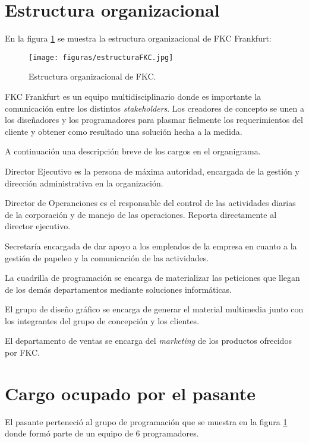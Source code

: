 \section{Estructura organizacional}

En la figura \ref{fig:estructuraFKC} se muestra la estructura organizacional de \gls{FKC} Frankfurt:

\begin{figure}[h]
\begin{center}
	\texttt{[image: figuras/estructuraFKC.jpg]}
	\caption{Estructura organizacional de \gls{FKC}.} \label{fig:estructuraFKC}
\end{center}
\end{figure}

\gls{FKC} Frankfurt es un equipo multidisciplinario donde es importante la comunicación entre los distintos \emph{stakeholders}. Los creadores de concepto se unen a los diseñadores y los programadores para plasmar fielmente los requerimientos del cliente y obtener como resultado una solución hecha a la medida.

A continuación una descripción breve de los cargos en el organigrama.

Director Ejecutivo es la persona de máxima autoridad, encargada de la gestión y dirección administrativa en la organización.

Director de Operanciones es el responsable del control de las actividades diarias de la corporación y de manejo de las operaciones. Reporta directamente al director ejecutivo.

Secretaría encargada de dar apoyo a los empleados de la empresa en cuanto a la gestión de papeleo y la comunicación de las actividades.

La cuadrilla de programación se encarga de materializar las peticiones que llegan de los demás departamentos mediante soluciones informáticas.

El grupo de diseño gráfico se encarga de generar el material multimedia junto con los integrantes del grupo de concepción y los clientes. 

El departamento de ventas se encarga del \emph{marketing} de los productos ofrecidos por \gls{FKC}.

\section{Cargo ocupado por el pasante} 

El pasante perteneció al grupo de programación que se muestra en la figura \ref{fig:estructuraFKC} donde formó parte de un equipo de 6 programadores.



